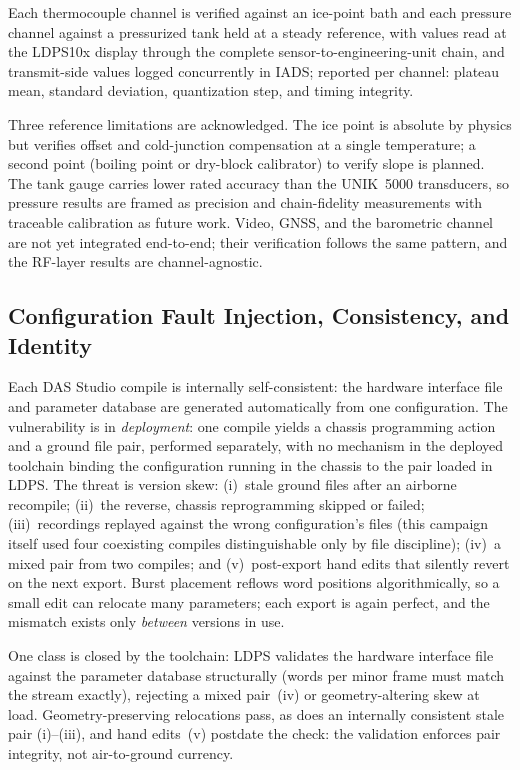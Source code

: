 \documentclass[12pt,letterpaper]{article}
\begin{document}
Each thermocouple channel is verified against an ice-point bath and each pressure channel
against a pressurized tank held at a steady reference, with values read at the LDPS10x
display through the complete sensor-to-engineering-unit chain, and transmit-side values
logged concurrently in IADS; reported per channel: plateau mean, standard deviation,
quantization step, and timing integrity.

Three reference limitations are acknowledged. The ice point is absolute by physics but
verifies offset and cold-junction compensation at a single temperature; a second point
(boiling point or dry-block calibrator) to verify slope is planned. The tank gauge carries
lower rated accuracy than the UNIK~5000 transducers, so pressure results are framed as
precision and chain-fidelity measurements with traceable calibration as future work. Video,
GNSS, and the barometric channel are not yet integrated end-to-end; their verification
follows the same pattern, and the RF-layer results are channel-agnostic.

\subsection{Configuration Fault Injection, Consistency, and Identity}\label{sec:fault}

Each DAS Studio compile is internally self-consistent: the hardware interface file and
parameter database are generated automatically from one configuration. The vulnerability is
in \emph{deployment}: one compile yields a chassis programming action and a ground file
pair, performed separately, with no mechanism in the deployed toolchain binding the
configuration running in the chassis to the pair loaded in LDPS. The threat is version skew:
(i)~stale ground files after an airborne recompile; (ii)~the reverse, chassis reprogramming
skipped or failed; (iii)~recordings replayed against the wrong configuration's files (this
campaign itself used four coexisting compiles distinguishable only by file discipline);
(iv)~a mixed pair from two compiles; and (v)~post-export hand edits that silently revert on
the next export. Burst placement reflows word positions algorithmically, so a small edit can
relocate many parameters; each export is again perfect, and the mismatch exists only
\emph{between} versions in use.

One class is closed by the toolchain: LDPS validates the hardware interface file against
the parameter database structurally (words per minor frame must match the stream exactly),
rejecting a mixed pair~(iv) or geometry-altering skew at load. Geometry-preserving
relocations pass, as does an internally consistent stale pair (i)--(iii), and hand
edits~(v) postdate the check: the validation enforces pair integrity, not air-to-ground
currency.
\end{document}
